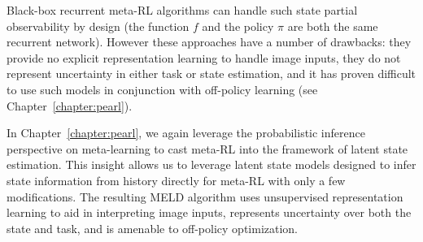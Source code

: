 Black-box recurrent meta-RL algorithms can handle such state partial observability by design (the function $f$ and the policy $\pi$ are both the same recurrent network).
However these approaches have a number of drawbacks: they provide no explicit representation learning to handle image inputs, they do not represent uncertainty in either task or state estimation, and it has proven difficult to use such models in conjunction with off-policy learning (see Chapter~\ref{chapter:pearl}). 

In Chapter~\ref{chapter:pearl}, we again leverage the probabilistic inference perspective on meta-learning to cast meta-RL into the framework of latent state estimation.
This insight allows us to leverage latent state models designed to infer state information from history directly for meta-RL with only a few modifications.
The resulting MELD algorithm uses unsupervised representation learning to aid in interpreting image inputs, represents uncertainty over both the state and task, and is amenable to off-policy optimization. 



